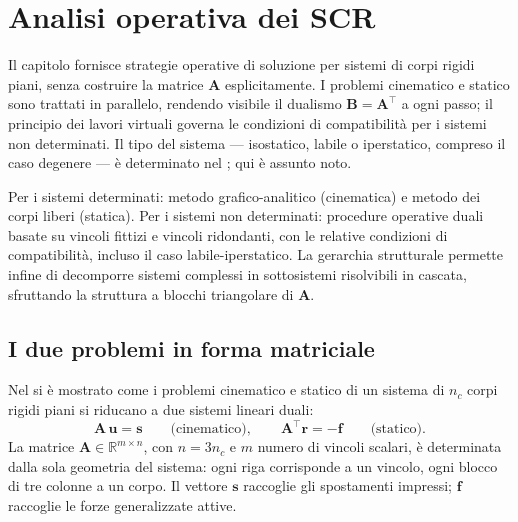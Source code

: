 \graphicspath{{Parti/P03-Meccanica_SR/C06-Analisi_operativa_dei_SCR/Figure/}}
\chapter{Analisi operativa dei SCR }\label{cap:classificazione_sol_SCR} %
\begin{sommario}
	Il capitolo fornisce strategie operative di soluzione per
	sistemi di corpi rigidi piani, senza costruire la matrice
	$\bm{A}$ esplicitamente. I problemi cinematico e statico sono
	trattati in parallelo, rendendo visibile il dualismo
	$\bm{B} = \bm{A}^{\top}$ a ogni passo; il principio dei lavori
	virtuali governa le condizioni di compatibilità per i sistemi
	non determinati. Il tipo del sistema --- isostatico, labile o
	iperstatico, compreso il caso degenere --- è determinato nel
	; qui è assunto noto.

	Per i sistemi determinati: metodo grafico-analitico (cinematica)
	e metodo dei corpi liberi (statica). Per i sistemi non
	determinati: procedure operative duali basate su vincoli fittizi
	e vincoli ridondanti, con le relative condizioni di
	compatibilità, incluso il caso labile-iperstatico. La gerarchia
	strutturale permette infine di decomporre sistemi complessi in
	sottosistemi risolvibili in cascata, sfruttando la struttura a
	blocchi triangolare di $\bm{A}$.
\end{sommario}


\section{I due problemi in forma matriciale}
\label{sec:formulazione}

Nel  si è mostrato come i
problemi cinematico e statico di un sistema di $n_c$ corpi
rigidi piani si riducano a due sistemi lineari duali:
\begin{equation}\label{eq:due_problemi}
	\bm{A}\,\bm{u} = \bm{s}
	\qquad\text{(cinematico)},
	\qquad
	\bm{A}^{\top}\bm{r} = -\bm{f}
	\qquad\text{(statico)}.
\end{equation}
La matrice $\bm{A}\in\mathbb{R}^{m\times n}$, con $n=3n_c$ e
$m$ numero di vincoli scalari, è determinata dalla sola
geometria del sistema: ogni riga corrisponde a un vincolo,
ogni blocco di tre colonne a un corpo. Il vettore $\bm{s}$
raccoglie gli spostamenti impressi; $\bm{f}$ raccoglie le forze
generalizzate attive.



